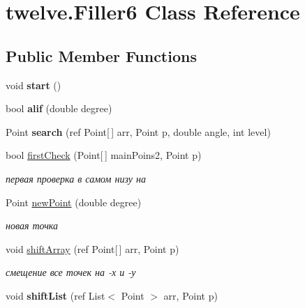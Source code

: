\hypertarget{classtwelve_1_1_filler6}{}\section{twelve.\+Filler6 Class Reference}
\label{classtwelve_1_1_filler6}
\subsection*{Public Member Functions}
\begin{DoxyCompactItemize}
\item 
\hypertarget{classtwelve_1_1_filler6_a2a590a9047b60772c8449842ce56295b}{}void {\bfseries start} ()\label{classtwelve_1_1_filler6_a2a590a9047b60772c8449842ce56295b}

\item 
\hypertarget{classtwelve_1_1_filler6_a7b0be121b51b1b8f6a51216373409917}{}bool {\bfseries alif} (double degree)\label{classtwelve_1_1_filler6_a7b0be121b51b1b8f6a51216373409917}

\item 
\hypertarget{classtwelve_1_1_filler6_a9466bf337125eb593ebdd9916fc81798}{}Point {\bfseries search} (ref Point\mbox{[}$\,$\mbox{]} arr, Point p, double angle, int level)\label{classtwelve_1_1_filler6_a9466bf337125eb593ebdd9916fc81798}

\item 
bool \hyperlink{classtwelve_1_1_filler6_a102142ff7777081638239014909ac71e}{first\+Check} (Point\mbox{[}$\,$\mbox{]} main\+Poins2, Point p)
\begin{DoxyCompactList}\small\item\em первая проверка в самом низу на \end{DoxyCompactList}\item 
Point \hyperlink{classtwelve_1_1_filler6_a9aec4e377da21a969f4ac1d8c2ef9d39}{new\+Point} (double degree)
\begin{DoxyCompactList}\small\item\em новая точка \end{DoxyCompactList}\item 
void \hyperlink{classtwelve_1_1_filler6_a1140cb98c5a30ff7d6f99fc42c7fe253}{shift\+Array} (ref Point\mbox{[}$\,$\mbox{]} arr, Point p)
\begin{DoxyCompactList}\small\item\em смещение все точек на -\/х и -\/у \end{DoxyCompactList}\item 
\hypertarget{classtwelve_1_1_filler6_a1d41e6f83ef0bc073fa36d605528f3c1}{}void {\bfseries shift\+List} (ref List$<$ Point $>$ arr, Point p)\label{classtwelve_1_1_filler6_a1d41e6f83ef0bc073fa36d605528f3c1}


\end{DoxyCompactItemize}
